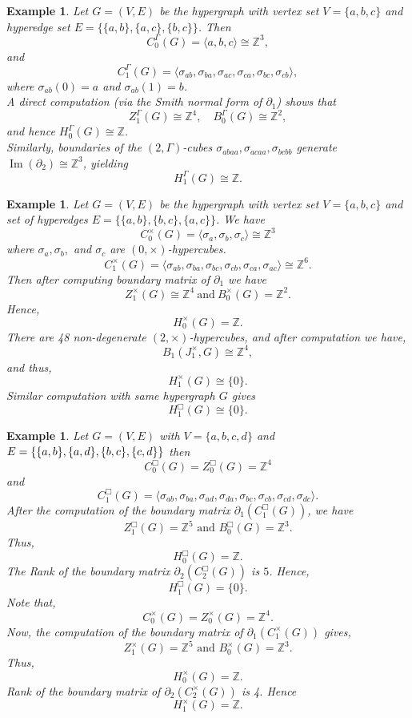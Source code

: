 \documentclass[11pt]{amsart}
\newtheorem{ex}[subsection]{Example}
\begin{document}
\begin{ex}\label{eg gamma 3-cycle}
Let $G=(V,E)$ be the hypergraph with vertex set $V=\{a,b,c\}$ and hyperedge set $E=\{\{a,b\},\{a,c\},\{b,c\}\}$. Then
\[
C_0^\Gamma(G)=\langle a,b,c \rangle \cong \mathbb{Z}^3,
\]
and
\[
C_1^\Gamma(G)=\langle \sigma_{ab}, \sigma_{ba}, \sigma_{ac}, \sigma_{ca}, \sigma_{bc}, \sigma_{cb} \rangle,
\]
where $\sigma_{ab}(0)=a$ and $\sigma_{ab}(1)=b$.
\\
A direct computation (via the Smith normal form of $\partial_1$) shows that
\[
Z_1^\Gamma(G)\cong \mathbb{Z}^4, \quad B_0^\Gamma(G)\cong \mathbb{Z}^2,
\]
and hence $H_0^\Gamma(G)\cong \mathbb{Z}$.
\\
Similarly, boundaries of the $(2,\Gamma)$-cubes $\sigma_{abaa}, \sigma_{acaa}, \sigma_{bcbb}$ generate $\operatorname{Im}(\partial_2)\cong \mathbb{Z}^3$, yielding
\[
H_1^\Gamma(G)\cong \mathbb{Z}.
\]
\end{ex}



\begin{ex}\label{eg x and box hom} 
	Let $G=(V,E)$ be the hypergraph with vertex set $V=\{a,b,c\}$ and set of hyperedges $E=\{\{a,b\},\{b,c\},\{a,c\}\}$. We have \[{C}_0^\times(G)=\langle \sigma_a,\sigma_b,\sigma_c\rangle \cong \mathbb{Z}^3\] where $\sigma_a,\sigma_b,$ and $\sigma_c$ are  $(0,\times)$-hypercubes. 	
    \[{C}_1^\times(G)=\langle \sigma_{ab},\sigma_{ba},\sigma_{bc},\sigma_{cb},\sigma_{ca},\sigma_{ac}\rangle \cong \mathbb{Z}^6.\] Then after computing boundary matrix of $\partial_1$ we have  \[{Z}_1^\times(G)\cong\mathbb{Z}^4 ~\text{and} ~ {B}_0^\times(G)=\mathbb{Z}^2.\] Hence, \[H_0^\times(G)=\mathbb{Z}.\] There are 48 non-degenerate $(2,\times)$-hypercubes, and after computation we have, \[{B}_1(J_1^\times,G)\cong \mathbb{Z}^4, \] and thus, \[H_1^\times(G)\cong \{0\}.\] Similar computation with same hypergraph $G$ gives \[H_1^\Box(G)\cong \{0\}.\] 
\end{ex}

\begin{ex}\label{eg box and x 1-hom}
Let $G=(V,E)$ with $V=\{a,b,c,d\}$ and $E=\{\{a,b\}, \{a,d\},\\ \{b,c\}, \{c,d\}\}$ then \[{C}_0^\Box(G)={Z}_0^\Box(G)=\mathbb{Z}^4\] and \[{C}_1^\Box(G)=\langle \sigma_{ab}, \sigma_{ba},\sigma_{ad},\sigma_{da},\sigma_{bc},\sigma_{cb}, \sigma_{cd},\sigma_{dc}\rangle.\] After the computation of the boundary matrix $\partial_{1}({C}_1^\Box(G))$, we have \[{Z}_1^\Box(G)=\mathbb{Z}^5 \text{ and } {B}_0^\Box(G)=\mathbb{Z}^3.\] Thus, \[H_0^\Box(G)= \mathbb{Z}.\] The Rank of the boundary matrix $\partial_{2}({C}_2^\Box(G))$ is $5$. Hence, \[H_1^\Box(G)=\{0\}.\] Note that, \[{C}_0^\times(G)={Z}_0^\times(G)=\mathbb{Z}^4.\] Now, the computation of the boundary matrix of $\partial_1({C}_1^\times(G))$ gives, \[{Z}_1^\times(G)=\mathbb{Z}^5 \text{ and } {B}_0^\times(G)=\mathbb{Z}^3.\] Thus, \[H_0^\times(G)=\mathbb{Z}.\] Rank of the boundary matrix of $\partial_{2}({C}_2^\times(G))$ is 4. Hence \[H_1^\times(G)=\mathbb{Z}.\]
\end{ex}
\end{document}

